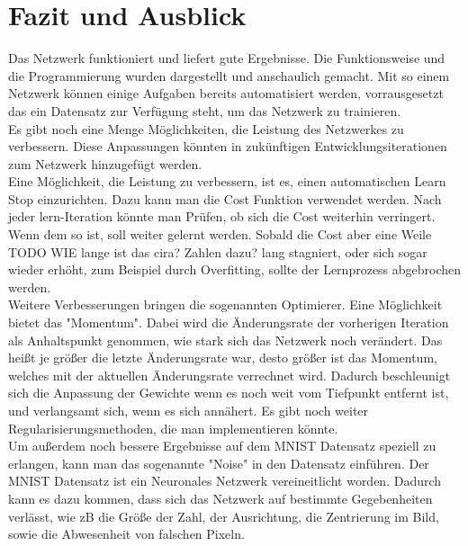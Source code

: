 \documentclass[12pt]{article}
\begin{document}
\section{Fazit und Ausblick}
Das Netzwerk funktioniert und liefert gute Ergebnisse. Die Funktionsweise und die Programmierung wurden dargestellt und anschaulich gemacht.
Mit so einem Netzwerk können einige Aufgaben bereits automatisiert werden, vorrausgesetzt das ein Datensatz zur Verfügung steht, um das Netzwerk zu trainieren.\\
Es gibt noch eine Menge Möglichkeiten, die Leistung des Netzwerkes zu verbessern. Diese Anpassungen könnten in zukünftigen Entwicklungsiterationen zum Netzwerk hinzugefügt werden.\\
Eine Möglichkeit, die Leistung zu verbessern, ist es, einen automatischen Learn Stop einzurichten. Dazu kann man die Cost Funktion verwendet werden. Nach jeder lern-Iteration könnte man Prüfen, ob sich die Cost weiterhin verringert. Wenn dem so ist, soll weiter gelernt werden. Sobald die Cost aber eine Weile TODO WIE lange ist das cira? Zahlen dazu? lang stagniert, oder sich sogar wieder erhöht, zum Beispiel durch Overfitting, sollte der Lernprozess abgebrochen werden. \\
Weitere Verbesserungen bringen die sogenannten Optimierer. Eine Möglichkeit bietet das "Momentum". Dabei wird die Änderungsrate der vorherigen Iteration als Anhaltspunkt genommen, wie stark sich das Netzwerk noch verändert. Das heißt je größer die letzte Änderungsrate war, desto größer ist das Momentum, welches mit der aktuellen Änderungsrate verrechnet wird. Dadurch beschleunigt sich die Anpassung der Gewichte wenn es noch weit vom Tiefpunkt entfernt ist, und verlangsamt sich, wenn es sich annähert. Es gibt noch weiter Regularisierungsmethoden, die man implementieren könnte.\\
Um außerdem noch bessere Ergebnisse auf dem MNIST Datensatz speziell zu erlangen, kann man das sogenannte "Noise" in den Datensatz einführen. Der MNIST Datensatz ist ein Neuronales Netzwerk vereineitlicht worden. Dadurch kann es dazu kommen, dass sich das Netzwerk auf bestimmte Gegebenheiten verlässt, wie zB die Größe der Zahl, der Ausrichtung, die Zentrierung im Bild, sowie die Abwesenheit von falschen Pixeln.\\
\end{document}

